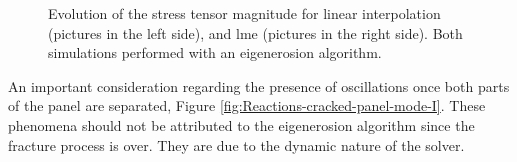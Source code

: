 \documentclass[preprint,12pt,a4paper]{elsarticle}
\begin{document}
\begin{figure}
\centering
{}
\caption{Evolution of the stress tensor magnitude for linear
  interpolation (pictures in the left side), and \acrshort{lme}
  (pictures in the right side). Both simulations performed with an
  eigenerosion algorithm.}
\label{fig:Stress-cracked-panel-mode-I}
\end{figure}
An important consideration regarding the presence of oscillations once
both parts of the panel are separated, Figure
\ref{fig:Reactions-cracked-panel-mode-I}. These phenomena should not be
attributed to the eigenerosion algorithm since the fracture process is
over. They are due to the dynamic nature of the solver.  
\end{document}
